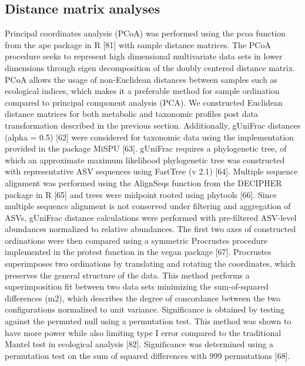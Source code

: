 \subsection{Distance matrix analyses} 
Principal coordinates analysis (PCoA) was performed using the pcoa function from the ape package in R [81] with sample distance matrices. The PCoA procedure seeks to represent high dimensional multivariate data sets in lower dimensions through eigen decomposition of the doubly centered distance matrix. PCoA allows the usage of non-Euclidean distances between samples such as ecological indices, which makes it a preferable method for sample ordination compared to principal component analysis (PCA). 
We constructed Euclidean distance matrices for both metabolic and taxonomic profiles post data transformation described in the previous section. Additionally, gUniFrac distances (alpha = 0.5) [62] were considered for taxonomic data using the implementation provided in the package MiSPU [63]. gUniFrac requires a phylogenetic tree, of which an approximate maximum likelihood phylogenetic tree was constructed with representative ASV sequences using FastTree (v 2.1) [64]. Multiple sequence alignment was performed using the AlignSeqs function from the DECIPHER package in R [65] and trees were midpoint rooted using phytools [66]. Since multiple sequence alignment is not conserved under filtering and aggregation of ASVs, gUniFrac distance calculations were performed with pre-filtered ASV-level abundances normalized to relative abundances. 
The first two axes of constructed ordinations were then compared using a symmetric Procrustes procedure implemented in the protest function in the vegan package [67]. Procrustes superimposes two ordinations by translating and rotating the coordinates, which preserves the general structure of the data.  This method performs a superimposition fit between two data sets minimizing the sum-of-squared differences (m2), which describes the degree of concordance between the two configurations normalized to unit variance. Significance is obtained by testing against the permuted null using a permutation test. This method was shown to have more power while also limiting type I error compared to the traditional Mantel test in ecological analysis [82]. Significance was determined using a permutation test on the sum of squared differences with 999 permutations [68]. 
